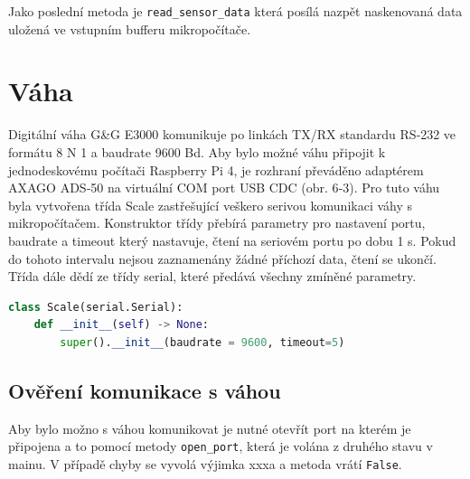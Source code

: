 %
%                
\bigskip
Jako poslední metoda je \texttt{read\_sensor\_data} která posílá nazpět naskenovaná data uložená ve vstupním bufferu mikropočítače.
%

\section{Váha}
Digitální váha G\&G E3000 komunikuje po linkách TX/RX standardu RS‑232 ve formátu 8 N 1 a baudrate 9600 Bd. Aby bylo možné váhu připojit k jednodeskovému počítači Raspberry Pi 4, je rozhraní převáděno adaptérem AXAGO ADS‑50 na virtuální COM port USB CDC (obr. 6‑3). Pro tuto váhu byla vytvořena třída Scale zastřešující veškero serivou komunikaci váhy s mikropočítačem. Konstruktor třídy přebírá parametry pro nastavení portu, baudrate a timeout který nastavuje, čtení na seriovém portu po dobu 1 s. Pokud do tohoto intervalu nejsou zaznamenány žádné příchozí data, čtení se ukončí. Třída dále dědí ze třídy serial, které předává všechny zmíněné parametry.

\begin{lstlisting}[language=Python,breaklines=false, frame=single]
class Scale(serial.Serial):
    def __init__(self) -> None:
        super().__init__(baudrate = 9600, timeout=5)
\end{lstlisting}

\subsection{Ověření komunikace s váhou}
Aby bylo možno s váhou komunikovat je nutné otevřít port na kterém je připojena a to pomocí metody \texttt{open\_port}, která je volána z druhého stavu v mainu. V případě chyby se vyvolá výjimka xxxa a metoda vrátí \texttt{False}.

